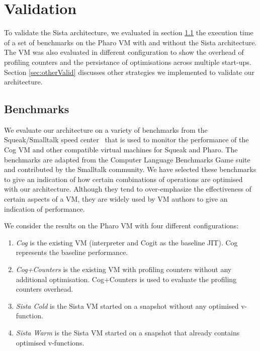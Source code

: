 \documentclass[a4paper,12pt,twoside]{../includes/ThesisStyle}
\begin{document}
\fi

\chapter{Validation}
\label{chap:validation}
\minitoc


To validate the Sista architecture, we evaluated in section \ref{sec:bench} the execution time of a set of benchmarks on the Pharo VM with and without the Sista architecture. The VM was also evaluated in different configuration to show the overhead of profiling counters and the persistance of optimisations across multiple start-ups. Section \ref{sec:otherValid} discusses other strategies we implemented to validate our architecture.

\section{Benchmarks}
\label{sec:bench}


We evaluate our architecture on a variety of benchmarks from the Squeak/Smalltalk speed center~\cite{Felg16a} that is used to monitor the performance of the Cog VM and other compatible virtual machines for Squeak and Pharo. The benchmarks are adapted from the Computer Language Benchmarks Game suite \cite{GameBenchs} and contributed by the Smalltalk community. We have selected these benchmarks to give an indication of how certain combinations of operations are optimised with our architecture. Although they tend to over-emphasize the effectiveness of certain aspects of a VM, they are widely used by VM authors to give an indication of performance.

We consider the results on the Pharo VM with four different configurations:
\begin{enumerate}
	\item \emph{Cog} is the existing VM (interpreter and Cogit as the baseline JIT). Cog represents the baseline performance.
	\item \emph{Cog+Counters} is the existing VM with profiling counters without any additional optimisation. Cog+Counters is used to evaluate the profiling counters overhead.
	\item \emph{Sista Cold} is the Sista VM started on a snapshot without any optimised v-function.
	\item \emph{Sista Warm} is the Sista VM started on a snapshot that already contains optimised v-functions.
\end{enumerate}
\end{document}
